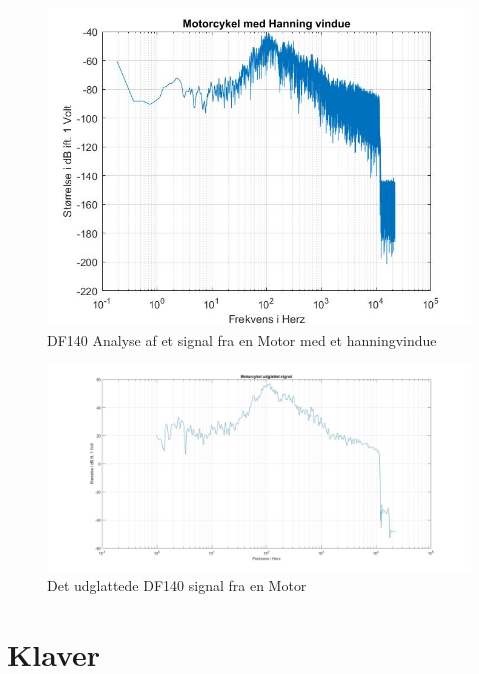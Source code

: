\begin{figure}[H]
	\centering
	\includegraphics[width=140mm]{figures/Motor/hanning.jpg}
	\caption{DF140 Analyse af et signal fra en Motor med et hanningvindue}
	\label{fig:Motor hanning}
\end{figure}

\begin{figure}[H]
	\centering
	\includegraphics[width=140mm]{figures/Motor/udglattet.jpg}
	\caption{Det udglattede DF140 signal fra en Motor}
	\label{fig:Motor udglattet}
\end{figure}

\section{Klaver}

